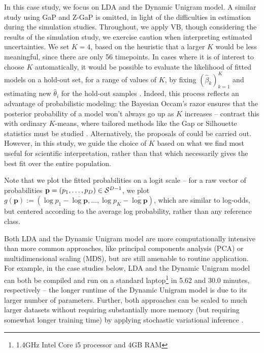\documentclass{article}
\begin{document}
In this case study, we focus on LDA and the Dynamic Unigram model. A similar
study using GaP and Z-GaP is omitted, in light of the difficulties in estimation
during the simulation studies. Throughout, we apply VB, though considering the
results of the simulation study, we exercise caution when interpreting estimated
uncertainties. We set $K = 4$, based on the heuristic that a larger $K$ would be
less meaningful, since there are only 56 timepoints. In cases where it is of
interest to choose $K$ automatically, it would be possible to evaluate the
likelihood of fitted models on a hold-out set, for a range of values of $K$, by
fixing $\left(\hat{\beta}_{k}\right)_{k = 1}^{K}$ and estimating new
$\hat{\theta}_{i}$ for the hold-out samples \citep{blei2003latent}. Indeed, this
process reflects an advantage of probabilistic modeling: the Bayesian Occam's
razor ensures that the posterior probability of a model won't always go up as
$K$ increases -- contrast this with ordinary $K$-means, where tailored methods
like the Gap or Silhouette statistics must be studied
\citep{rasmussen2001occam, tibshirani2001estimating, kaufman2009finding}.
Alternatively, the proposals of \citep{wallach2009evaluation} could be carried
out. However, in this study, we guide the choice of $K$ based on what we find
most useful for scientific interpretation, rather than that which necessarily
gives the best fit over the entire population.

Note that we plot the fitted probabilities on a logit scale -- for a raw vector
of probabilities $\mathbf{p} = \left(p_{1}, \dots, p_{D}\right) \in
\mathcal{S}^{D - 1}$, we plot $g\left(\mathbf{p}\right) := \left(\log p_{1} -
\overline{\log \mathbf{p}}, \dots, \log p_{K} - \overline{\log
  \mathbf{p}}\right)$, which are similar to log-odds, but centered according to
the average log probability, rather than any reference class.

Both LDA and the Dynamic Unigram model are more computationally intensive than
more common approaches, like principal components analysis (PCA) or
multidimensional scaling (MDS), but are still amenable to routine application.
For example, in the case studies below, LDA and the Dynamic Unigram model can
both be compiled and run on a standard laptop\footnote{1.4GHz Intel Core i5
  processor and 4GB RAM} in 5.62 and 30.0 minutes, respectively -- the longer
runtime of the Dynamic Unigram model is due to its larger number of parameters.
Further, both approaches can be scaled to much larger datasets without requiring
substantially more memory (but requiring somewhat longer training time) by
applying stochastic variational inference \citep{hoffman2013stochastic,
  kucukelbir2015automatic}.
\end{document}
